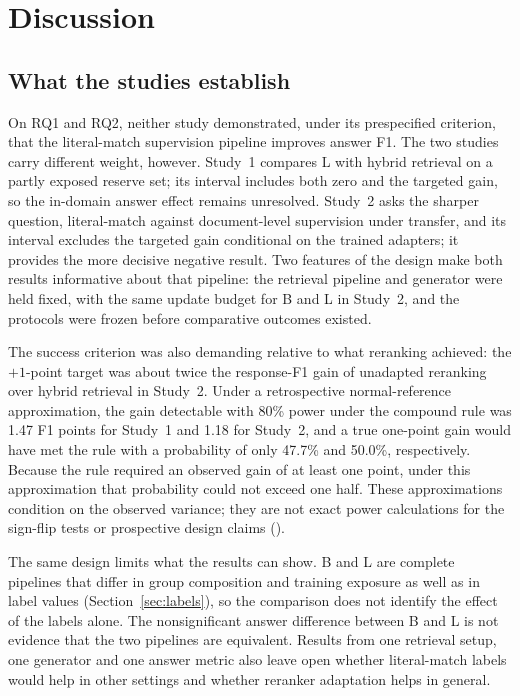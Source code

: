 \section{Discussion}\label{sec:discussion}
\subsection{What the studies establish}
On RQ1 and RQ2, neither study demonstrated, under its prespecified criterion, that the literal-match supervision pipeline improves answer F1. The two studies carry different weight, however. Study~1 compares L with hybrid retrieval on a partly exposed reserve set; its interval includes both zero and the targeted gain, so the in-domain answer effect remains unresolved. Study~2 asks the sharper question, literal-match against document-level supervision under transfer, and its interval excludes the targeted gain conditional on the trained adapters; it provides the more decisive negative result. Two features of the design make both results informative about that pipeline: the retrieval pipeline and generator were held fixed, with the same update budget for B and L in Study~2, and the protocols were frozen before comparative outcomes existed.

The success criterion was also demanding relative to what reranking achieved: the $+1$-point target was about twice the response-F1 gain of unadapted reranking over hybrid retrieval in Study~2. Under a retrospective normal-reference approximation, the gain detectable with 80\% power under the compound rule was 1.47 F1 points for Study~1 and 1.18 for Study~2, and a true one-point gain would have met the rule with a probability of only 47.7\% and 50.0\%, respectively. Because the rule required an observed gain of at least one point, under this approximation that probability could not exceed one half. These approximations condition on the observed variance; they are not exact power calculations for the sign-flip tests or prospective design claims ().

The same design limits what the results can show. B and L are complete pipelines that differ in group composition and training exposure as well as in label values (Section~\ref{sec:labels}), so the comparison does not identify the effect of the labels alone. The nonsignificant answer difference between B and L is not evidence that the two pipelines are equivalent. Results from one retrieval setup, one generator and one answer metric also leave open whether literal-match labels would help in other settings and whether reranker adaptation helps in general.

